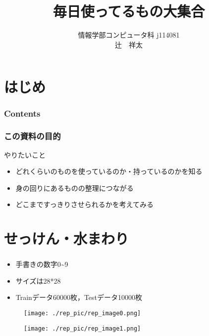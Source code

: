 \documentclass[dvipdfmx]{beamer}
\title{毎日使ってるもの大集合}
\institute{工学院大学}
\author{情報学部コンピュータ科 j114081 \\ 辻　祥太}
\date{}
\begin{document}
\section*{はじめ}
\begin{frame}
  \titlepage
\end{frame}

\begin{frame}[plain]
  \frametitle{Contents}
  \tableofcontents
\end{frame}

\begin{frame}
  \frametitle{この資料の目的}
  やりたいこと
  \begin{itemize}
    \item どれくらいのものを使っているのか・持っているのかを知る
    \item 身の回りにあるものの整理につながる
    \item どこまですっきりさせられるかを考えてみる
  \end{itemize}
\end{frame}

\section{せっけん・水まわり}
\begin{frame}
  \frametitle{}
  \begin{itemize}
    \item 手書きの数字0\textasciitilde9
    \item サイズは28*28
    \item Trainデータ60000枚，Testデータ10000枚
  \end{itemize}
  \begin{figure}
    \centering
    \begin{minipage}{0.4\columnwidth}
      \centering
      \texttt{[image: ./rep\_pic/rep\_image0.png]}
    \end{minipage}
    \begin{minipage}{0.4\columnwidth}
      \centering
      \texttt{[image: ./rep\_pic/rep\_image1.png]}
    \end{minipage}
  \end{figure}
\end{frame}
\end{document}
